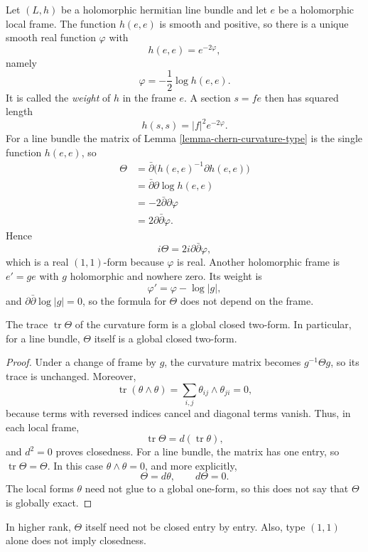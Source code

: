 \begin{remark}
\label{remark-line-bundle-weight}
Let $(L,h)$ be a holomorphic hermitian
line bundle and let $e$ be a holomorphic
local frame. The function $h(e,e)$ is
smooth and positive, so there is a unique
smooth real function $\varphi$ with
$$
h(e,e)=e^{-2\varphi},
$$
namely
$$
\varphi=-\frac{1}{2}\log h(e,e).
$$
It is called the {\it weight} of $h$ in
the frame $e$. A section $s=fe$ then has
squared length
$$
h(s,s)=|f|^2e^{-2\varphi}.
$$
For a line bundle the matrix of
Lemma \ref{lemma-chern-curvature-type}
is the single function $h(e,e)$, so
$$
\begin{aligned}
\Theta
&=\bar\partial
\bigl(h(e,e)^{-1}\partial h(e,e)\bigr)\\
&=\bar\partial\partial\log h(e,e)\\
&=-2\bar\partial\partial\varphi\\
&=2\partial\bar\partial\varphi.
\end{aligned}
$$
Hence
$$
i\Theta=2i\partial\bar\partial\varphi,
$$
which is a real $(1,1)$-form because
$\varphi$ is real.
Another holomorphic frame is $e'=ge$
with $g$ holomorphic and nowhere zero.
Its weight is
$$
\varphi'=\varphi-\log|g|,
$$
and $\partial\bar\partial\log|g|=0$,
so the formula for $\Theta$ does not
depend on the frame.
\end{remark}

\begin{lemma}
\label{lemma-curvature-trace-closed}
The trace $\operatorname{tr}\Theta$ of
the curvature form is a global closed
two-form. In particular, for a line
bundle, $\Theta$ itself is a global
closed two-form.
\end{lemma}

\begin{proof}
Under a change of frame by $g$, the
curvature matrix becomes
$g^{-1}\Theta g$, so its trace is
unchanged.
Moreover,
$$
\operatorname{tr}(\theta\wedge\theta)
=\sum_{i,j}\theta_{ij}\wedge\theta_{ji}
=0,
$$
because terms with reversed indices
cancel and diagonal terms vanish.
Thus, in each local frame,
$$
\operatorname{tr}\Theta
=d(\operatorname{tr}\theta),
$$
and $d^2=0$ proves closedness.
For a line bundle, the matrix has one
entry, so $\operatorname{tr}\Theta=\Theta$.
In this case $\theta\wedge\theta=0$,
and more explicitly,
$$
\Theta=d\theta,\qquad d\Theta=0.
$$
The local forms $\theta$ need not glue
to a global one-form, so this does not
say that $\Theta$ is globally exact.
\end{proof}

\noindent
In higher rank, $\Theta$ itself need
not be closed entry by entry.
Also, type $(1,1)$ alone does not imply
closedness.

